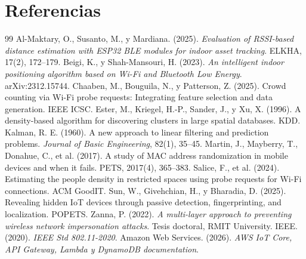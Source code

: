 \documentclass[12pt,a4paper]{article}
\begin{document}
\section*{Referencias}
\begin{thebibliography}{99}
 Al-Maktary, O., Susanto, M., y Mardiana. (2025). \emph{Evaluation of RSSI-based distance estimation with ESP32 BLE modules for indoor asset tracking}. ELKHA, 17(2), 172--179.
 Beigi, K., y Shah-Mansouri, H. (2023). \emph{An intelligent indoor positioning algorithm based on Wi-Fi and Bluetooth Low Energy}. arXiv:2312.15744.
 Chaaben, M., Bouguila, N., y Patterson, Z. (2025). Crowd counting via Wi-Fi probe requests: Integrating feature selection and data generation. IEEE ICSC.
 Ester, M., Kriegel, H.-P., Sander, J., y Xu, X. (1996). A density-based algorithm for discovering clusters in large spatial databases. KDD.
 Kalman, R. E. (1960). A new approach to linear filtering and prediction problems. \emph{Journal of Basic Engineering}, 82(1), 35--45.
 Martin, J., Mayberry, T., Donahue, C., et al. (2017). A study of MAC address randomization in mobile devices and when it fails. PETS, 2017(4), 365--383.
 Salice, F., et al. (2024). Estimating the people density in restricted spaces using probe requests for Wi-Fi connections. ACM GoodIT.
 Sun, W., Givehchian, H., y Bharadia, D. (2025). Revealing hidden IoT devices through passive detection, fingerprinting, and localization. POPETS.
 Zanna, P. (2022). \emph{A multi-layer approach to preventing wireless network impersonation attacks}. Tesis doctoral, RMIT University.
 IEEE. (2020). \emph{IEEE Std 802.11-2020}.
 Amazon Web Services. (2026). \emph{AWS IoT Core, API Gateway, Lambda y DynamoDB documentation}.
\end{thebibliography}
\end{document}
